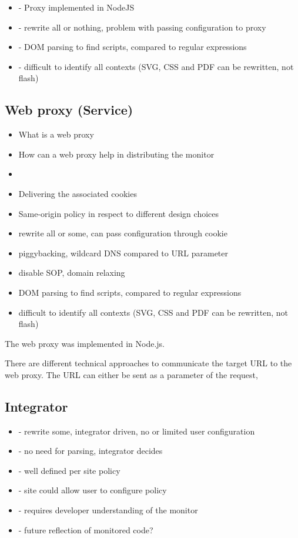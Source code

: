 \documentclass{llncs}
\begin{document}
\begin{itemize}
\item- Proxy implemented in NodeJS
\item- rewrite all or nothing, problem with passing configuration to proxy
\item- DOM parsing to find scripts, compared to regular expressions
\item- difficult to identify all contexts (SVG, CSS and PDF can be rewritten, not flash)
\end{itemize}



\subsection{Web proxy (Service)}

\begin{itemize}
\item What is a web proxy
\item How can a web proxy help in distributing the monitor
\item 
\item Delivering the associated cookies
\item Same-origin policy in respect to different design choices
\item rewrite all or some, can pass configuration through cookie
\item piggybacking, wildcard DNS compared to URL parameter
\item disable SOP, domain relaxing
\item DOM parsing to find scripts, compared to regular expressions
\item difficult to identify all contexts (SVG, CSS and PDF can be rewritten, not flash)
\end{itemize}


The web proxy was implemented in Node.js. 

There are different technical approaches to communicate the target URL to the web 
proxy. The URL can either be sent as a parameter of the request, 

\subsection{Integrator}

\begin{itemize}
\item- rewrite some, integrator driven, no or limited user configuration
\item- no need for parsing, integrator decides
\item- well defined per site policy
\item- site could allow user to configure policy
\item- requires developer understanding of the monitor
\item- future reflection of monitored code?
\end{itemize}
\end{document}
